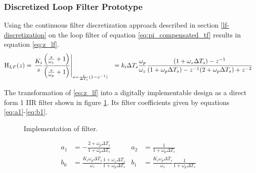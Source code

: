 	\subsubsection{Discretized Loop Filter Prototype}\label{disc_lf_comp_pi}
		Using the continuous filter discretization approach described in section \ref{lf-discretization} on the loop filter of equation \ref{eq:pi_compensated_tf} results in equation \ref{eq:z_lf}.
		\begin{align}
			\textnormal{H}_{LF}(z) & = \left.\frac{K_i}{s}\frac{\left(\frac{s}{\omega_z} + 1\right)}{\left(\frac{s}{\omega_p} + 1\right)}\right\vert_{s=\frac{1}{\Delta T_s}(1-z^{-1})}
			&= k_i\Delta T_s\frac{\omega_p}{\omega_z}\frac{(1+\omega_z\Delta T_s)-z^{-1}}{(1+\omega_p\Delta T_s) - z^{-1}(2+\omega_p\Delta T_s) + z^{-2}}\label{eq:z_lf}
		\end{align}

		The transformation of \ref{eq:z_lf} into a digitally implementable design as a direct form 1 IIR filter shown in figure \ref{fig:filt_imple}. Its filter coefficients given by equations \ref{eq:a1}-\ref{eq:b1}.
		\begin{figure}[htb!]
			\center
			\caption{Implementation of filter.}
			\label{fig:filt_imple}
		\end{figure}
		\begin{align}
			a_1 &= -\frac{2+\omega_p\Delta T_s}{1+\omega_p\Delta T_s}\label{eq:a1} 
			& a_2 &= \frac{1}{1+\omega_p\Delta T_s} \\
			b_0 &= \frac{K_i\omega_p\Delta T_s}{\omega_z}\frac{1+\omega_z\Delta T_s}{1+\omega_p\Delta T_s}
			& b_1 &= \frac{K_i\omega_p\Delta T_s}{\omega_z}\frac{1}{1+\omega_p\Delta T_s}\label{eq:b1}
		\end{align}


